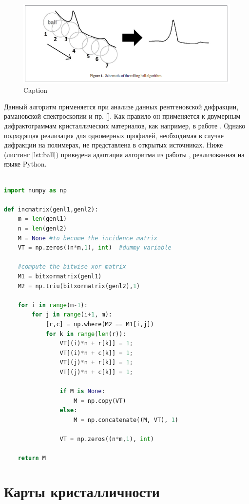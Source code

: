 	\begin{figure}[h]
	    \centering
	    \includegraphics[width=\linewidth]{fig/ball.PNG}
	    \caption{Caption}
	    \label{fig:ball}
	\end{figure}
	Данный алгоритм применяется при анализе данных рентгеновской дифракции, рамановской спектроскопии и пр. []. Как правило он применяется к двумерным дифрактограммам кристаллических материалов, как например, в работе \cite{ball2018}. Однако подходящая реализация для одномерных профилей, необходимая в случае дифракции на полимерах, не представлена в открытых источниках. Ниже (листинг \ref{lst:ball}) приведена адаптация алгоритма из работы \cite{ball-code}, реализованная на языке Python. 
	
	
	\begin{lstlisting}[language=Python, caption=Python example, label={lst:ball}]
	
import numpy as np
 
def incmatrix(genl1,genl2):
    m = len(genl1)
    n = len(genl2)
    M = None #to become the incidence matrix
    VT = np.zeros((n*m,1), int)  #dummy variable
 
    #compute the bitwise xor matrix
    M1 = bitxormatrix(genl1)
    M2 = np.triu(bitxormatrix(genl2),1) 
 
    for i in range(m-1):
        for j in range(i+1, m):
            [r,c] = np.where(M2 == M1[i,j])
            for k in range(len(r)):
                VT[(i)*n + r[k]] = 1;
                VT[(i)*n + c[k]] = 1;
                VT[(j)*n + r[k]] = 1;
                VT[(j)*n + c[k]] = 1;
 
                if M is None:
                    M = np.copy(VT)
                else:
                    M = np.concatenate((M, VT), 1)
 
                VT = np.zeros((n*m,1), int)
 
    return M
\end{lstlisting}
	
	\section{Карты кристалличности}
	
